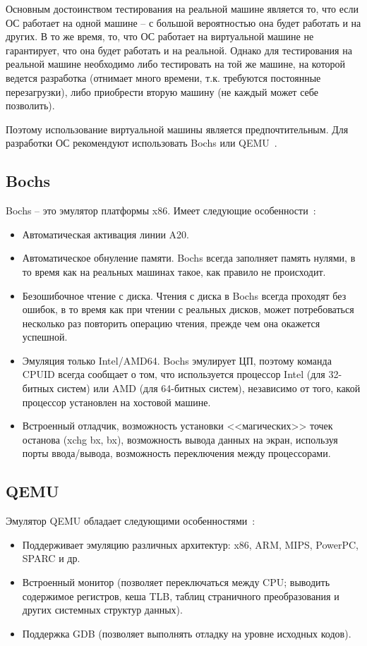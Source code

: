 Основным достоинством тестирования на реальной машине является то, что если
ОС работает на одной машине -- с большой вероятностью она будет работать и
на других. В то же время, то, что ОС работает на виртуальной машине не
гарантирует, что она будет работать и на реальной. Однако для тестирования
на реальной машине необходимо либо тестировать на той же машине, на которой
ведется разработка (отнимает много времени, т.к. требуются постоянные
перезагрузки), либо приобрести вторую машину (не каждый может себе позволить).

Поэтому использование виртуальной машины является предпочтительным. Для
разработки ОС рекомендуют использовать Bochs или QEMU~\cite{os_dev}.

\subsection{Bochs}
Bochs -- это эмулятор платформы x86. Имеет следующие особенности~\cite{os_dev}:
\begin{itemize}
\item Автоматическая активация линии A20.
\item Автоматическое обнуление памяти. Bochs всегда заполняет память нулями, в то время как
	на реальных машинах такое, как правило не происходит.
\item Безошибочное чтение с диска. Чтения с диска в Bochs всегда проходят без ошибок, в то
	время как при чтении с реальных дисков, может потребоваться несколько раз повторить
	операцию чтения, прежде чем она окажется успешной.
\item Эмуляция только Intel/AMD64. Bochs эмулирует ЦП, поэтому команда CPUID всегда сообщает
	о том, что используется процессор Intel (для 32-битных систем) или AMD (для 64-битных систем),
	независимо от того, какой процессор установлен на хостовой машине.
\item Встроенный отладчик, возможность установки <<магических>> точек останова (xchg bx, bx),
	возможность вывода данных на экран, используя порты ввода/вывода, возможность переключения
	между процессорами.
\end{itemize}

\subsection{QEMU}
Эмулятор QEMU обладает следующими особенностями~\cite{os_dev}:
\begin{itemize}
\item Поддерживает эмуляцию различных архитектур: x86, ARM, MIPS, PowerPC, SPARC и др.
\item Встроенный монитор (позволяет переключаться между CPU; выводить содержимое регистров, кеша TLB,
	таблиц страничного преобразования и других системных структур данных).
\item Поддержка GDB (позволяет выполнять отладку на уровне исходных кодов).
\end{itemize}

